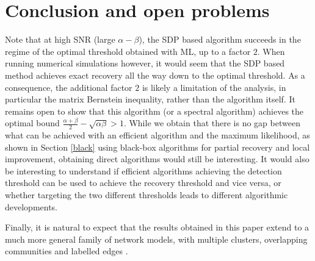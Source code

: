 \documentclass[english]{article}
\newcommand{\1}{\textbf{1}}
\begin{document}





\section{Conclusion and open problems}
Note that at high SNR (large $\alpha-\beta$), the SDP based algorithm succeeds in the regime of the optimal threshold obtained with ML, up to a factor $2$. When running numerical simulations however, it would seem that the SDP based method achieves exact recovery all the way down to the optimal threshold. As a consequence, the additional factor $2$ is likely a limitation of the analysis, in particular the matrix Bernstein inequality, rather than the algorithm itself.
It remains open to show that this algorithm (or a spectral algorithm) achieves the optimal bound $\frac{\alpha + \beta}2 - \sqrt{\alpha \beta}>1$.  
While we obtain that there is no gap between what can be achieved with an efficient algorithm and the maximum likelihood, as shown in Section \ref{black} using black-box algorithms for partial recovery and local improvement, obtaining direct algorithms would still be interesting. 
It would also be interesting to understand if efficient algorithms achieving the detection threshold can be used to achieve the recovery threshold and vice versa, or whether targeting the two different thresholds leads to different algorithmic developments.

Finally, it is natural to expect that the results obtained in this paper extend to a much more general family of network models, with multiple clusters,  overlapping communities \cite{mixed} and labelled edges \cite{jiaming}. 
   
\end{document}
